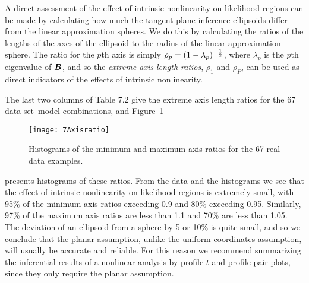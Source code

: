 A direct assessment of the effect of intrinsic nonlinearity on
likelihood regions can be made by calculating how much
the tangent plane inference ellipsoids differ from the
linear approximation spheres.
We do this by calculating the ratios of the lengths of the axes
of the ellipsoid to the radius of the linear approximation sphere.
The ratio for the $p $th axis is simply
$ \rho_p = ( 1 - \lambda_p )^{{-} {1\over 2}}$, where
$\lambda_p $ is the $p $th eigenvalue of ${\boldsymbol B}$, and so
the {\em extreme axis length ratios}, $\rho_{1}$
and $\rho_{P}$, can be used as direct indicators of the
effects of intrinsic nonlinearity.

The last two columns of Table 7.2 give
the extreme axis length ratios for the 67 data set--model
combinations, and Figure~\ref{fig:Axisratio}
\begin{figure}
  \centerline{\texttt{[image: 7Axisratio]}}%
  \caption{\label{fig:Axisratio}
  Histograms of the minimum and maximum axis ratios for the 67 real
  data examples.  }
\end{figure}
presents histograms of these ratios.
From the data and the histograms
we see that the effect of intrinsic nonlinearity on
likelihood regions is extremely small,
with 95\% of the minimum axis ratios exceeding 0.9 and 80\%
exceeding 0.95.
Similarly, 97\% of the maximum axis
ratios are less than 1.1 and 70\% are less than 1.05.
The deviation of an ellipsoid from a sphere by 5 or 10\%
is quite small, and so we conclude that the planar assumption,
unlike the uniform coordinates assumption, will usually be
accurate and reliable.
For this reason we recommend summarizing the inferential results
of a nonlinear analysis by profile $t$ and profile pair plots,
since they only require the planar assumption.


